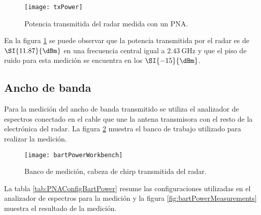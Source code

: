 \begin{figure}[htb]
 \centering
 \texttt{[image: txPower]}
 \caption{Potencia transmitida del radar medida con un PNA.}
 \label{fig:txPowerMeasurements}
\end{figure}

En la figura \ref{fig:txPowerMeasurements} se puede observar que la potencia transmitida por el radar es de $\SI{11.87}{\dBm}$ en una frecuencia central igual a $\SI{2.43}{\giga\hertz}$ y que el piso de ruido para esta medición se encuentra en los $\SI{-15}{\dBm}$.

\subsection{Ancho de banda}

Para la medición del ancho de banda transmitido se utiliza el analizador de espectros conectado en el cable que une la antena transmisora con el resto de la electrónica del radar. La figura \ref{fig:bartPowerConnections} muestra el banco de trabajo utilizado para realizar la medición.

\begin{figure}[H]
 \centering
 \texttt{[image: bartPowerWorkbench]}
 \caption{Banco de medición, cabeza de chirp transmitida del radar.}
 \label{fig:bartPowerConnections}
\end{figure}

La tabla \ref{tab:PNAConfigBartPower} resume las configuraciones utilizadas en el analizador de espectros para la medición y la figura \ref{fig:bartPowerMeasurements} muestra el resultado de la medición.


